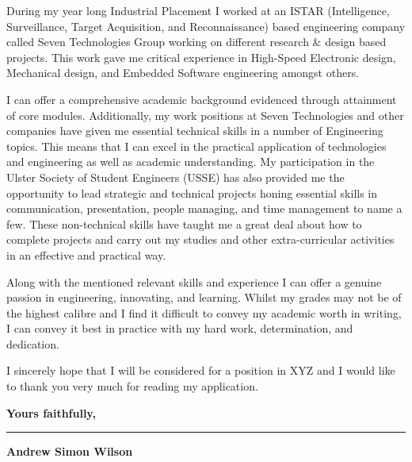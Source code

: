 \documentclass[12pt,a4paper,ragged2e,withhyper]{altacv}
\begin{document}
During my year long Industrial Placement I worked at an ISTAR (Intelligence, Surveillance, Target Acquisition, and Reconnaissance) based engineering company called Seven Technologies Group working on different research \& design based projects. This work gave me critical experience in High-Speed Electronic design, Mechanical design, and Embedded Software engineering amongst others. \linebreak


I can offer a comprehensive academic background evidenced through attainment of core modules. Additionally, my work positions at Seven Technologies and other companies have given me essential technical skills in a number of Engineering topics. This means that I can excel in the practical application of technologies and engineering as well as academic understanding. My participation in the Ulster Society of Student Engineers (USSE) has also provided me the opportunity to lead strategic and technical projects honing essential skills in communication, presentation, people managing, and time management to name a few. These non-technical skills have taught me a great deal about how to complete projects and carry out my studies and other extra-curricular activities in an effective and practical way. \linebreak


Along with the mentioned relevant skills and experience I can offer a genuine passion in engineering, innovating, and learning. Whilst my grades may not be of the highest calibre and I find it difficult to convey my academic worth in writing, I can convey it best in practice with my hard work, determination, and dedication. \linebreak


I sincerely hope that I will be considered for a position in XYZ and I would like to thank you very much for reading my application.
\vspace{5mm}


\textbf{Yours faithfully,}\\
\vspace{5mm}

{\color{headingrule}\rule{6cm}{1pt}\par} 
\vspace{2mm}
\large\textbf{\color{tagline}Andrew Simon Wilson}
\end{document}
